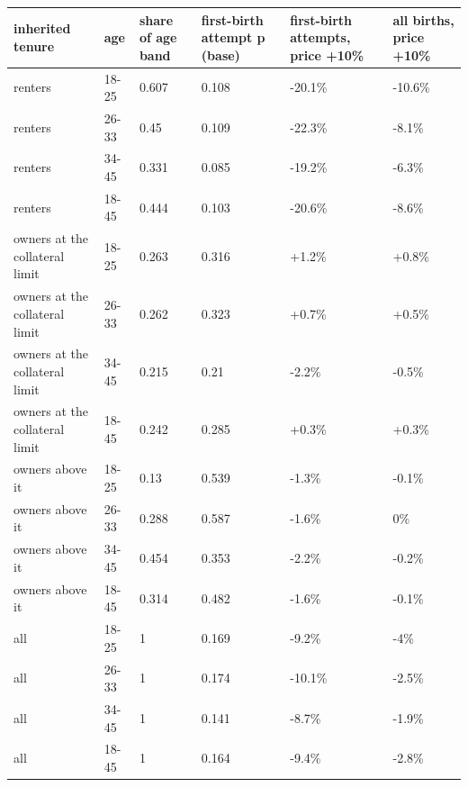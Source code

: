 \begingroup\small
\setlength{\tabcolsep}{3pt}
\renewcommand{\arraystretch}{1.04}
\begin{tabularx}{\linewidth}{XXXXXX}
\toprule
inherited tenure & age & share of age band & first-birth attempt p (base) & first-birth attempts, price +10\% & all births, price +10\% \\
\midrule
renters & 18-25 & 0.607 & 0.108 & -20.1\% & -10.6\% \\
renters & 26-33 & 0.45 & 0.109 & -22.3\% & -8.1\% \\
renters & 34-45 & 0.331 & 0.085 & -19.2\% & -6.3\% \\
renters & 18-45 & 0.444 & 0.103 & -20.6\% & -8.6\% \\
owners at the collateral limit & 18-25 & 0.263 & 0.316 & +1.2\% & +0.8\% \\
owners at the collateral limit & 26-33 & 0.262 & 0.323 & +0.7\% & +0.5\% \\
owners at the collateral limit & 34-45 & 0.215 & 0.21 & -2.2\% & -0.5\% \\
owners at the collateral limit & 18-45 & 0.242 & 0.285 & +0.3\% & +0.3\% \\
owners above it & 18-25 & 0.13 & 0.539 & -1.3\% & -0.1\% \\
owners above it & 26-33 & 0.288 & 0.587 & -1.6\% & 0\% \\
owners above it & 34-45 & 0.454 & 0.353 & -2.2\% & -0.2\% \\
owners above it & 18-45 & 0.314 & 0.482 & -1.6\% & -0.1\% \\
all & 18-25 & 1 & 0.169 & -9.2\% & -4\% \\
all & 26-33 & 1 & 0.174 & -10.1\% & -2.5\% \\
all & 34-45 & 1 & 0.141 & -8.7\% & -1.9\% \\
all & 18-45 & 1 & 0.164 & -9.4\% & -2.8\% \\
\bottomrule
\end{tabularx}
\endgroup
